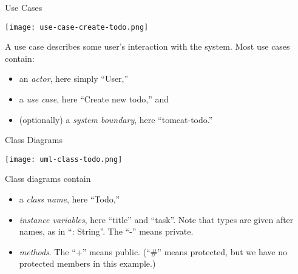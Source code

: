 \documentclass{beamer}
\begin{document}
\begin{frame}[fragile]{Use Cases}


\begin{center}
\texttt{[image: use-case-create-todo.png]}
\end{center}

A use case describes some user's interaction with the system.  Most use cases contain:
\begin{itemize}
\item an {\it actor}, here simply ``User,''
\item a {\it use case}, here ``Create new todo,'' and
\item (optionally) a {\it system boundary}, here ``tomcat-todo.''
\end{itemize}


\end{frame}

\begin{frame}[fragile]{Class Diagrams}


\begin{center}
\texttt{[image: uml-class-todo.png]}
\end{center}
\vspace{-.25in}
Class diagrams contain
\begin{itemize}
\item a {\it class name}, here ``Todo,''
\item {\it instance variables}, here ``title'' and ``task''.  Note that types are given after names, as in ``: String''.  The ``-'' means private.
\item {\it methods}.  The ``+'' means public. (``\#'' means protected, but we have no protected members in this example.)
\end{itemize}


\end{frame}
\end{document}
